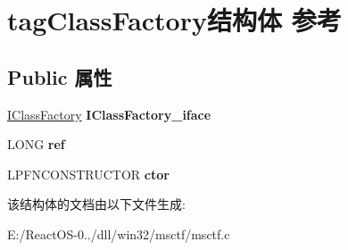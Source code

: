 \hypertarget{structtag_class_factory}{}\section{tag\+Class\+Factory结构体 参考}
\label{structtag_class_factory}
\subsection*{Public 属性}
\begin{DoxyCompactItemize}
\item 
\mbox{\label{structtag_class_factory_acd3fd02ff7e8d87b00c4a62dba10da1b}} 
\hyperlink{interface_i_class_factory}{I\+Class\+Factory} {\bfseries I\+Class\+Factory\+\_\+iface}
\item 
\mbox{\label{structtag_class_factory_afbb6f8d897b6bc7e9d509a57f333b039}} 
L\+O\+NG {\bfseries ref}
\item 
\mbox{\label{structtag_class_factory_a950fe712ca1d3c2b68dddd5e6c86f30a}} 
L\+P\+F\+N\+C\+O\+N\+S\+T\+R\+U\+C\+T\+OR {\bfseries ctor}
\end{DoxyCompactItemize}


该结构体的文档由以下文件生成\+:\begin{DoxyCompactItemize}
\item 
E\+:/\+React\+O\+S-\/0../dll/win32/msctf/msctf.\+c\end{DoxyCompactItemize}
